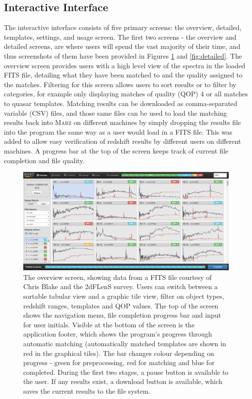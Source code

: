 \documentclass[5p]{elsarticle}
\newcommand{\marz}{\textsc{Marz}}
\begin{document}
\subsection{Interactive Interface}

The interactive interface consists of five primary screens: the overview, detailed, templates, settings, and usage screen. The first two screens - the overview and detailed screens, are where users will spend the vast majority of their time, and thus screenshots of them have been provided in Figures \ref{fig:overview} and \ref{fig:detailed}. The overview screen provides users with a high level view of the spectra in the loaded FITS file, detailing what they have been matched to and the quality assigned to the matches. Filtering for this screen allows users to sort results or to filter by categories, for example only displaying matches of quality (QOP) 4 or all matches to quasar templates. Matching results can be downloaded as comma-separated variable (CSV) files, and those same files can be used to load the matching results back into \marz{} on different machines by simply dropping the results file into the program the same way as a user would load in a FITS file. This was added to allow easy verification of redshift results by different users on different machines. A progress bar at the top of the screen keeps track of current file completion and file quality.\\



\begin{figure}[h]
\centering
\includegraphics[width=\textwidth]{InterfaceZ.png}
\caption{The overview screen, showing data from a FITS file courtesy of Chris Blake and the 2dFLenS survey. Users can switch between a sortable tabular view and a graphic tile view, filter on object types, redshift ranges, templates and QOP values. The top of the screen shows the navigation menu, file completion progress bar and input for user initials. Visible at the bottom of the screen is the application footer, which shows the program's progress through automatic matching (automatically matched templates are shown in red in the graphical tiles). The bar changes colour depending on progress - green for preprocessing, red for matching and blue for completed. During the first two stages, a pause button is available to the user. If any results exist, a download button is available, which saves the current results to the file system.}
\label{fig:overview}
\end{figure}
\end{document}
